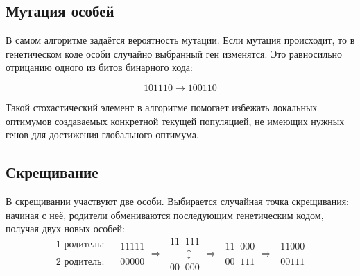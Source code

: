 	\subsection{Мутация особей}
	
	В самом алгоритме задаётся вероятность мутации. Если мутация происходит, то в генетическом коде особи случайно выбранный ген изменятся. Это равносильно отрицанию одного из битов бинарного кода:
	
	\begin{equation*}
		101110 \to 100110
	\end{equation*}

	Такой стохастический элемент в алгоритме помогает избежать локальных оптимумов создаваемых конкретной текущей популяцией, не имеющих нужных генов для достижения глобального оптимума.
	
	\subsection{Скрещивание}
	
	В скрещивании участвуют две особи. Выбирается случайная точка скрещивания: начиная с неё, родители обмениваются последующим генетическим кодом, получая двух новых особей: 
	\begin{equation*}
		\begin{matrix}
			\text{1 родитель:} \\ \\ \text{2 родитель:}
		\end{matrix}\;\;\;
		\begin{matrix}
			11111 \\ \\ 00000
		\end{matrix} \Rightarrow\;
		\begin{matrix}
			11\;\;111 \\ \;\;\;\;\;\;\updownarrow \\ 00\;\;000
		\end{matrix} \Rightarrow\;
		\begin{matrix}
			11\;\;000 \\ \\ 00\;\;111
		\end{matrix} \Rightarrow\;
		\begin{matrix}
			11000 \\ \\ 00111
		\end{matrix} 
	\end{equation*}


